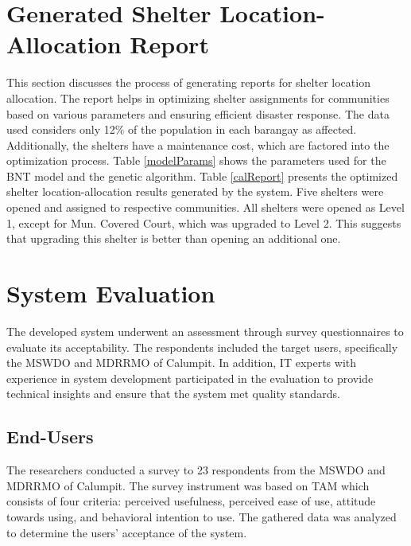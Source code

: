 \documentclass[12pt,a4paper,]{article}
\begin{document}
	\section{Generated Shelter Location-Allocation Report}
	This section discusses the process of generating reports for shelter location allocation. The report helps in optimizing shelter assignments for communities based on various parameters and ensuring efficient disaster response. The data used considers only 12\% of the population in each barangay as affected. Additionally, the shelters have a maintenance cost, which are factored into the optimization process.
	Table \ref{modelParams} shows the parameters used for the BNT model and the genetic algorithm. Table \ref{calReport} presents the optimized shelter location-allocation results generated by the system. Five shelters were opened and assigned to respective communities. All shelters were opened as Level 1, except for Mun. Covered Court, which was upgraded to Level 2. This suggests that upgrading this shelter is better than opening an additional one.
	\section{System Evaluation}
	The developed system underwent an assessment through survey questionnaires to evaluate its acceptability. The respondents included the target users, specifically the MSWDO and MDRRMO of Calumpit. In addition, IT experts with experience in system development participated in the evaluation to provide technical insights and ensure that the system met quality standards.
	
	\subsection{End-Users}
	The researchers conducted a survey to 23 respondents from the MSWDO and MDRRMO of Calumpit. The survey instrument was based on TAM which consists of four criteria: perceived usefulness, perceived ease of use, attitude towards using, and behavioral intention to use. The gathered data was analyzed to determine the users’ acceptance of the system. 
	
\end{document}
